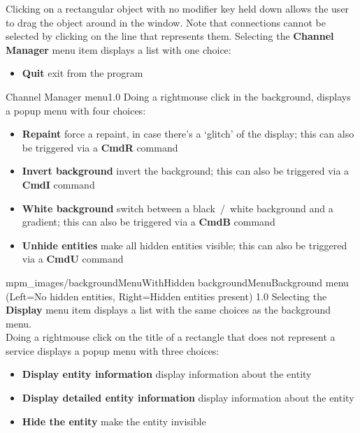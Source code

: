 Clicking on a rectangular object with no modifier key held down allows the user to drag
the object around in the window.
Note that connections cannot be selected by clicking on the line that represents them.
\clearpage
Selecting the \textbf{Channel Manager} menu item displays a list with one choice:
\begin{itemize}
\item\textbf{Quit} exit from the program
\end{itemize}
%
{Channel Manager menu}{1.0}
\clearpage
Doing a right\longDash{}mouse click in the background, displays a popup menu with four
choices:
\begin{itemize}
\item\textbf{Repaint} force a repaint, in case there's a `glitch' of the display; this
can also be triggered via a \textbf{Cmd\longDash{}R} command
\item\exSp\textbf{Invert background} invert the background; this can also be triggered via
a \textbf{Cmd\longDash{}I} command
\item\exSp\textbf{White background} switch between a black~/~white background and a
gradient; this can also be triggered via a \textbf{Cmd\longDash{}B} command
\item\exSp\textbf{Unhide entities} make all hidden entities visible; this can also be
triggered via a \textbf{Cmd\longDash{}U} command
\end{itemize}
%
{mpm_images/backgroundMenuWithHidden}%
{backgroundMenu}{Background menu (Left=No hidden entities, Right=Hidden
entities present)}%
{1.0}
Selecting the \textbf{Display} menu item displays a list with the same choices as the
background menu.\\
\clearpage
Doing a right\longDash{}mouse click on the title of a rectangle that does not represent a
service displays a popup menu with three choices:
\begin{itemize}
\item\textbf{Display entity information} display information about the entity
\item\exSp\textbf{Display detailed entity information} display information about the
entity
\item\exSp\textbf{Hide the entity} make the entity invisible
\end{itemize}
